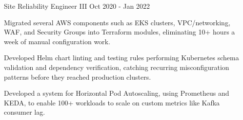 \begin{cventries}
  \cventry
    {Site Reliability Engineer III} %
    {} %
    {} %
    {Oct 2020 - Jan 2022} %
    {
      \begin{cvitems} %
        \item {Migrated several AWS components such as EKS clusters, VPC/networking, WAF, and Security Groups into Terraform modules, eliminating 10+ hours a week of manual configuration work.}
        \item {Developed Helm chart linting and testing rules performing Kubernetes schema validation and dependency verification, catching recurring misconfiguration patterns before they reached production clusters.}
        \item {Developed a system for Horizontal Pod Autoscaling, using Prometheus and KEDA, to enable 100+ workloads to scale on custom metrics like Kafka consumer lag.}
      \end{cvitems}
    }


\end{cventries}
